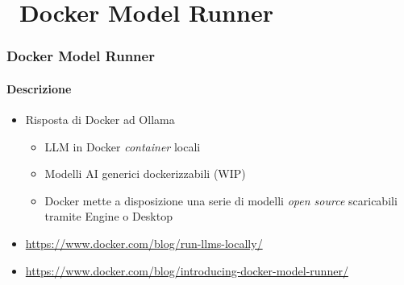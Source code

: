 \section{\faWrench\ Docker Model Runner} %
\label{sec:spring-ai-project-setup}
%
\begin{frame}[t,fragile] \frametitle{Docker Model Runner}
    \framesubtitle{Descrizione}
    \begin{itemize}[leftmargin=10pt,align=right]
        \item[\alert{\faArrowCircleRight}] Risposta di Docker ad Ollama
        \begin{itemize}[leftmargin=10pt,align=right]
            \item[\alert{\faArrowCircleRight}] LLM in Docker \textit{container} locali
            \item[\alert{\faArrowCircleRight}] Modelli AI generici dockerizzabili (WIP)
            \item[\alert{\faArrowCircleRight}] Docker mette a disposizione una serie di modelli \textit{open source} scaricabili tramite Engine o Desktop
        \end{itemize}

    \item[\alert{\faExternalLink}] \url{https://www.docker.com/blog/run-llms-locally/}
    \item[\alert{\faExternalLink}] \url{https://www.docker.com/blog/introducing-docker-model-runner/}
    \end{itemize}
\end{frame}
%
